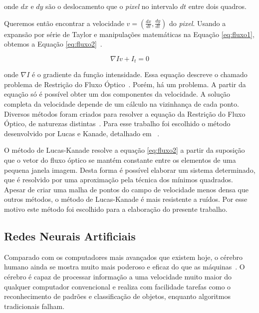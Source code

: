 \noindent onde $dx$ e $dy$ são o deslocamento que o \textit{pixel} no intervalo $dt$ entre dois quadros.

Queremos então encontrar a velocidade $v =(\frac{dx}{dt},\frac{dy}{dt})$ do \textit{pixel}. Usando a expansão por série de Taylor e manipulações matemáticas na Equação \ref{eq:fluxo1}, obtemos a Equação \ref{eq:fluxo2}~\cite{faria1992fluxo}.

\begin{equation}
	\nabla Iv + I_t = 0
\label{eq:fluxo2}
\end{equation}

\noindent onde $\nabla I$ é o gradiente da função intensidade. Essa equação descreve o chamado problema de Restrição do Fluxo Óptico~\cite{mota2011tensor}. Porém, há um problema. A partir da equação só é possível obter um dos componentes da velocidade. A solução completa da velocidade depende de um cálculo na vizinhança de cada ponto. Diversos métodos foram criados para resolver a equação da Restrição do Fluxo Óptico, de naturezas distintas~\cite{mota2011tensor}. Para esse trabalho foi escolhido o método desenvolvido por Lucas e Kanade, detalhado em ~\cite{bruhn2005lucas,faria1992fluxo,mota2011tensor}.

O método de Lucas-Kanade resolve a equação \ref{eq:fluxo2} a partir da suposição que o vetor do fluxo óptico se mantém constante entre os elementos de uma pequena janela imagem. Desta forma é possível elaborar um sistema determinado, que é resolvido por uma aproximação pela técnica dos mínimos quadrados. Apesar de criar uma malha de pontos do campo de velocidade menos densa que outros métodos, o método de Lucas-Kanade é mais resistente a ruídos. Por esse motivo este método foi escolhido para a elaboração do presente trabalho.




\subsection{Redes Neurais Artificiais} \label{cap:redes}

Comparado com os computadores mais avançados que existem hoje, o cérebro humano ainda se mostra muito mais poderoso e eficaz do que as máquinas~\cite{Haykin}. O cérebro é capaz de processar informação a uma velocidade muito maior do qualquer computador convencional e realiza com facilidade tarefas como o reconhecimento de padrões e classificação de objetos, enquanto algoritmos tradicionais falham. 

